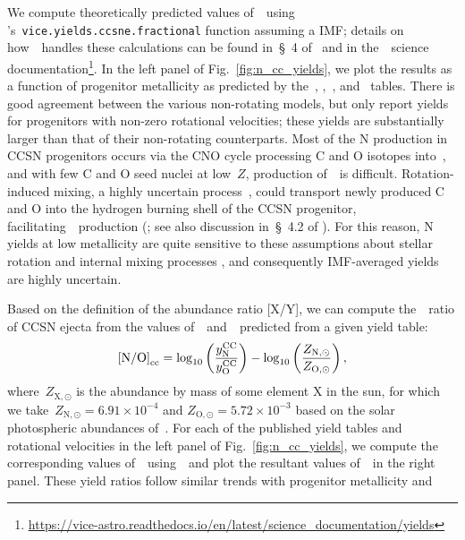\documentclass[ms.tex]{subfiles}
\begin{document}
We compute theoretically predicted values of~~using
\vice's~\texttt{vice.yields.ccsne.fractional} function assuming a
\citet{Kroupa2001} IMF; details on how~\vice~handles these calculations can be
found in~\S~4 of~\citet{Griffith2021} and in the~\vice~science 
documentation\footnote{
\url{https://vice-astro.readthedocs.io/en/latest/science_documentation/yields}
}.
In the left panel of Fig.~\ref{fig:n_cc_yields}, we plot the results as a
function of progenitor metallicity as predicted by the~\citet{Woosley1995},
\citet*{Nomoto2013},~\citet{Sukhbold2016}, and~\citet{Limongi2018} tables.
There is good agreement between the various non-rotating models, but only
\citet{Limongi2018} report yields for progenitors with non-zero rotational
velocities; these yields are substantially larger than that of their
non-rotating counterparts.
Most of the N production in CCSN progenitors occurs via the CNO cycle
processing C and O isotopes into~\Nfourteen, and with few C and O seed nuclei
at low~$Z$, production of~\Nfourteen~is difficult.
Rotation-induced mixing, a highly uncertain process~\citep{Zahn1992, Maeder1998,
Lagarde2012}, could transport newly produced C and O into the hydrogen burning
shell of the CCSN progenitor, facilitating~\Nfourteen~production
(\citealp{Frischknecht2016}; see also discussion in~\S~4.2 of
\citealp{Andrews2017}).
For this reason, N yields at low metallicity are quite sensitive to these
assumptions about stellar rotation and internal mixing processes
\citep{Heger2010}, and consequently IMF-averaged yields are highly uncertain.
\par
Based on the definition of the abundance ratio [X/Y], we can compute
the~\no~ratio of CCSN ejecta from the values of~~and~~predicted
from a given yield table:
\begin{equation}
\text{[N/O]}_\text{cc} = 
\log_{10}\left(\frac{y_\text{N}^\text{CC}}{y_\text{O}^\text{CC}}\right) -
\log_{10}\left(\frac{Z_{\text{N},\odot}}{Z_{\text{O},\odot}}\right),
\label{eq:no_subcc}
\end{equation}
where~$Z_{\text{X},\odot}$ is the abundance by mass of some element X in the
sun, for which we take~$Z_{\text{N},\odot} = 6.91\times10^{-4}$ and
$Z_{\text{O},\odot} = 5.72\times10^{-3}$ based on the solar photospheric
abundances of~\citet{Asplund2009}.
For each of the published yield tables and rotational velocities in the left
panel of Fig.~\ref{fig:n_cc_yields}, we compute the corresponding values
of~~using~\vice~and plot the resultant values of~\no\subcc~in the right
panel.
These yield ratios follow similar trends with progenitor metallicity and
\end{document}
